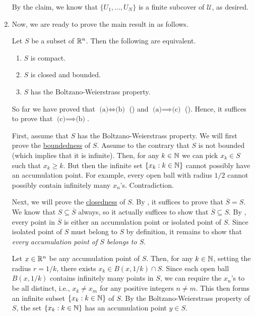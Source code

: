 \begin{enumerate}
\begin{pf}
By the claim, we know that \(\{U_1,\dotsc,U_N\}\) is a finite subcover of
\(\mathcal{U}\), as desired.
\end{pf}


\item Now, we are ready to prove the main result in
 as follows.

\begin{theorem}
\label{thm:cpt-equiv-criteria-rn}
Let \(S\) be a subset of \(\mathbb{R}^n\). Then the following are equivalent.
\begin{enumerate}
\item \(S\) is compact.
\item \(S\) is closed and bounded.
\item \(S\) has the Boltzano-Weierstrass property.
\end{enumerate}
\end{theorem}
\begin{pf}
So far we have proved that \(\text{(a)}\iff\text{(b)}\)
() and
\(\text{(a)}\implies \text{(c)}\) (). Hence, it
suffices to prove that \(\text{(c)}\implies \text{(b)}\).

First, assume that \(S\) has the Boltzano-Weierstrass property. We will first
prove the \underline{boundedness} of \(S\). Assume to the contrary that \(S\)
is not bounded (which implies that it is infinite). Then, for any \(k\in\mathbb{N}\) we
can pick \(x_k\in S\) such that \(x_k\ge k\). But then the infinite set
\(\{x_k:k\in\mathbb{N}\}\) cannot possibly have an accumulation point. For example,
every open ball with radius \(1/2\) cannot possibly contain infinitely many
\(x_n\)'s. Contradiction.

Next, we will prove the \underline{closedness} of \(S\). By
, it suffices to prove that \(\overline{S}=S\).  We
know that \(S\subseteq \overline{S}\) always, so it actually suffices to show
that \(\overline{S}\subseteq S\). By
, every point in \(\overline{S}\)
is either an accumulation point or isolated point of \(S\). Since isolated
point of \(S\) must belong to \(S\) by definition, it remains to show that
\emph{every accumulation point of \(S\) belongs to \(S\)}.

Let \(x\in\mathbb{R}^n\) be any accumulation point of \(S\). Then, for any \(k\in\mathbb{N}\),
setting the radius \(r=1/k\), there exists \(x_k\in B(x,1/k)\cap S\). Since each open
ball \(B(x,1/k)\) contains infinitely many points in \(S\), we can require the
\(x_n\)'s to be all distinct, i.e., \(x_k\ne x_m\) for any positive integers
\(n\ne m\). This then forms an infinite subset \(\{x_k:k\in\mathbb{N}\}\) of \(S\). By
the Boltzano-Weierstrass property of \(S\), the set \(\{x_k:k\in\mathbb{N}\}\) has an
accumulation point \(y\in S\).


\end{pf}
\end{enumerate}
